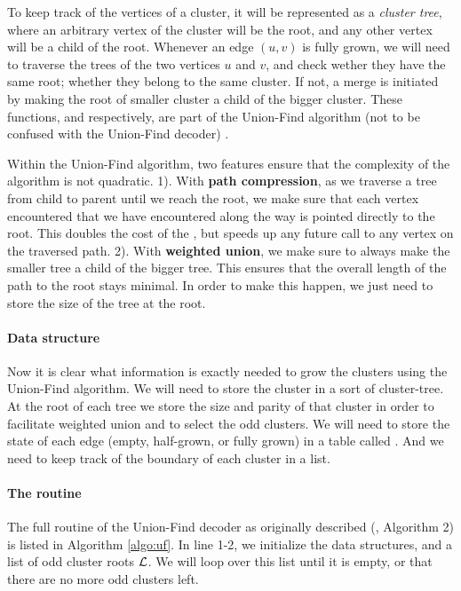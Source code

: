 To keep track of the vertices of a cluster, it will be represented as a \emph{cluster tree}, where an arbitrary vertex of the cluster will be the root, and any other vertex will be a child of the root. Whenever an edge $(u,v)$ is fully grown, we will need to traverse the trees of the two vertices $u$ and $v$, and check wether they have the same root; whether they belong to the same cluster. If not, a merge is initiated by making the root of smaller cluster a child of the bigger cluster. These functions,  and  respectively, are part of the Union-Find algorithm (not to be confused with the Union-Find decoder) \cite{tarjan1975efficiency}.



Within the Union-Find algorithm, two features ensure that the complexity of the algorithm is not quadratic. 1). With \textbf{path compression}, as we traverse a tree from child to parent until we reach the root, we make sure that each vertex encountered that we have encountered along the way is pointed directly to the root. This doubles the cost of the , but speeds up any future call to any vertex on the traversed path. 2). With \textbf{weighted union}, we make sure to always make the smaller tree a child of the bigger tree. This ensures that the overall length of the path to the root stays minimal. In order to make this happen, we just need to store the size of the tree at the root.

\paragraph{Data structure}
Now it is clear what information is exactly needed to grow the clusters using the Union-Find algorithm. We will need to store the cluster in a sort of cluster-tree. At the root of each tree we store the size and parity of that cluster in order to facilitate weighted union and to select the odd clusters. We will need to store the state of each edge (empty, half-grown, or fully grown) in a table called . And we need to keep track of the boundary of each cluster in a  list.

\paragraph{The routine}
The full routine of the Union-Find decoder as originally described (\cite{delfosse2017almost}, Algorithm 2) is listed in Algorithm \ref{algo:uf}. In line 1-2, we initialize the data structures, and a list of odd cluster roots $\mathcal{L}$. We will loop over this list until it is empty, or that there are no more odd clusters left.

